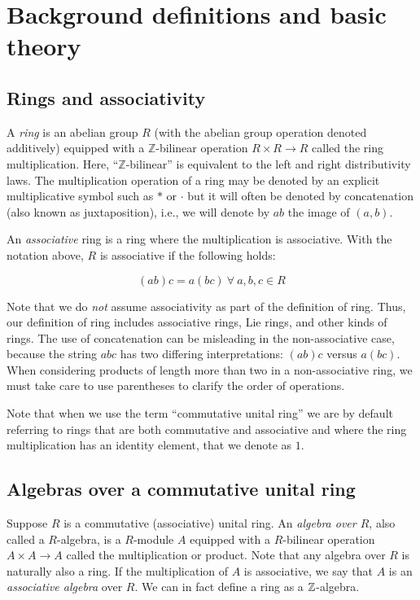 \section{Background definitions and basic theory}\label{appsec:background-grouptheory}

\subsection{Rings and associativity}

A {\em ring} is an abelian group $R$ (with the abelian group operation
denoted additively) equipped with a $\mathbb{Z}$-bilinear operation $R
\times R \to R$ called the ring multiplication. Here,
``$\mathbb{Z}$-bilinear'' is equivalent to the left and right
distributivity laws. The multiplication operation of a ring may be
denoted by an explicit multiplicative symbol such as $*$ or $\cdot$
but it will often be denoted by concatenation (also known as
juxtaposition), i.e., we will denote by $ab$ the image of $(a,b)$.

An {\em associative} ring is a ring where the multiplication is
associative. With the notation above, $R$ is associative if the
following holds:

$$(ab)c = a(bc) \ \forall \ a,b,c \in R$$

Note that we do {\em not} assume associativity as part of the
definition of ring. Thus, our definition of ring includes associative
rings, Lie rings, and other kinds of rings. The use of concatenation
can be misleading in the non-associative case, because the string
$abc$ has two differing interpretations: $(ab)c$ versus $a(bc)$. When
considering products of length more than two in a non-associative
ring, we must take care to use parentheses to clarify the order of
operations.

Note that when we use the term ``commutative unital ring'' we are by
default referring to rings that are both commutative and associative
 and where the ring multiplication has an identity element, that we
denote as $1$.

\subsection{Algebras over a commutative unital ring}

Suppose $R$ is a commutative (associative) unital ring. An {\em algebra
  over $R$}, also called a $R$-algebra, is a $R$-module $A$ equipped
with a $R$-bilinear operation $A \times A \to A$ called the
multiplication or product. Note that any algebra over $R$ is naturally
also a ring. If the multiplication of $A$ is associative, we say that
$A$ is an {\em associative algebra} over $R$. We can in fact define a
ring as a $\mathbb{Z}$-algebra.

